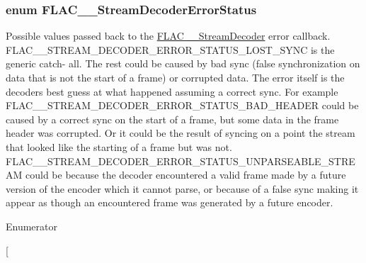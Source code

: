 \subsubsection[{\texorpdfstring{F\+L\+A\+C\+\_\+\+\_\+\+Stream\+Decoder\+Error\+Status}{FLAC__StreamDecoderErrorStatus}}]{\setlength{\rightskip}{0pt plus 5cm}enum {\bf F\+L\+A\+C\+\_\+\+\_\+\+Stream\+Decoder\+Error\+Status}}\hypertarget{group__flac__stream__decoder_ga130e70bd9a73d3c2416247a3e5132ecf}{}\label{group__flac__stream__decoder_ga130e70bd9a73d3c2416247a3e5132ecf}
Possible values passed back to the \hyperlink{struct_f_l_a_c_____stream_decoder}{F\+L\+A\+C\+\_\+\+\_\+\+Stream\+Decoder} error callback. {\ttfamily F\+L\+A\+C\+\_\+\+\_\+\+S\+T\+R\+E\+A\+M\+\_\+\+D\+E\+C\+O\+D\+E\+R\+\_\+\+E\+R\+R\+O\+R\+\_\+\+S\+T\+A\+T\+U\+S\+\_\+\+L\+O\+S\+T\+\_\+\+S\+Y\+NC} is the generic catch-\/ all. The rest could be caused by bad sync (false synchronization on data that is not the start of a frame) or corrupted data. The error itself is the decoder\textquotesingle{}s best guess at what happened assuming a correct sync. For example {\ttfamily F\+L\+A\+C\+\_\+\+\_\+\+S\+T\+R\+E\+A\+M\+\_\+\+D\+E\+C\+O\+D\+E\+R\+\_\+\+E\+R\+R\+O\+R\+\_\+\+S\+T\+A\+T\+U\+S\+\_\+\+B\+A\+D\+\_\+\+H\+E\+A\+D\+ER} could be caused by a correct sync on the start of a frame, but some data in the frame header was corrupted. Or it could be the result of syncing on a point the stream that looked like the starting of a frame but was not. {\ttfamily F\+L\+A\+C\+\_\+\+\_\+\+S\+T\+R\+E\+A\+M\+\_\+\+D\+E\+C\+O\+D\+E\+R\+\_\+\+E\+R\+R\+O\+R\+\_\+\+S\+T\+A\+T\+U\+S\+\_\+\+U\+N\+P\+A\+R\+S\+E\+A\+B\+L\+E\+\_\+\+S\+T\+R\+E\+AM} could be because the decoder encountered a valid frame made by a future version of the encoder which it cannot parse, or because of a false sync making it appear as though an encountered frame was generated by a future encoder. \begin{Desc}
\item[Enumerator]\par
\begin{description}
\item[{\em 
}
\end{description}
\end{Desc}
